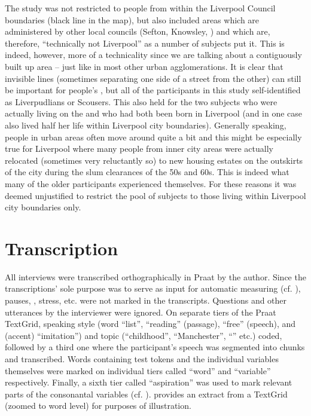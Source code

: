 The study was not restricted to people from within the Liverpool Council boundaries (black line in the map), but also included areas which are administered by other local councils (Sefton, Knowsley, ) and which are, therefore, ``technically not Liverpool'' as a number of subjects put it. This is indeed, however, more of a technicality since we are talking about a contiguously built up area -- just like in most other urban agglomerations. It is clear that invisible lines (sometimes separating one side of a street from the other) can still be important for people's , but all of the participants in this study self-identified as Liverpudlians or Scousers. This also held for the two subjects who were actually living on the  and who had both been born in Liverpool (and in one case also lived half her life within Liverpool city boundaries). Generally speaking, people in urban areas often move around quite a bit and this might be especially true for Liverpool where many people from inner city areas were actually relocated (sometimes very reluctantly so) to new housing estates on the outskirts of the city during the slum clearances of the 50s and 60s. This is indeed what many of the older participants experienced themselves. For these reasons it was deemed unjustified to restrict the pool of subjects to those living within Liverpool city boundaries only.

	\section{Transcription}\label{sec.prod_method.transcription}

All interviews were transcribed orthographically in Praat \parencite{praat} by the author.
Since the transcriptions' sole purpose was to serve as input for automatic measuring (cf. ), pauses, , stress, etc. were not marked in the transcripts.
Questions and other utterances by the interviewer were  ignored.
On separate tiers of the Praat TextGrid, speaking style (word ``list'', ``reading'' (passage), ``free'' (speech), and (accent) ``imitation'') and topic (``childhood'', ``Manchester'', ``'' etc.) coded, followed by a third one where the participant's speech was segmented into chunks and transcribed.
Words containing test tokens and the individual variables themselves were marked on individual tiers called ``word'' and ``variable'' respectively.
Finally, a sixth tier called ``aspiration'' was used to mark relevant parts of the consonantal variables (cf. ).
 provides an extract from a TextGrid (zoomed to word level) for purposes of illustration.

